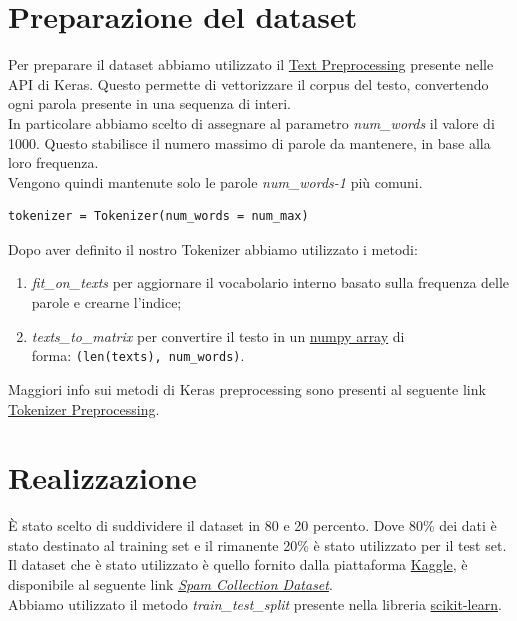 \section{Preparazione del dataset}
Per preparare il dataset abbiamo utilizzato il \href{https://keras.io/preprocessing/text/#Tokenizer}{Text Preprocessing} presente nelle API di Keras. Questo permette di vettorizzare il corpus del testo, convertendo ogni parola presente in una sequenza di interi.\\
In particolare abbiamo scelto di assegnare al parametro \textit{num\_words} il valore di 1000. Questo stabilisce il numero massimo di parole da mantenere, in base alla loro frequenza.\\
Vengono quindi mantenute solo le parole \textit{num\_words-1} più comuni.
\begin{lstlisting}[backgroundcolor = \color{white}]
tokenizer = Tokenizer(num_words = num_max)
\end{lstlisting}
Dopo aver definito il nostro Tokenizer abbiamo utilizzato i metodi: 
\begin{enumerate}
	\item \textit{fit\_on\_texts} per aggiornare il vocabolario interno basato sulla frequenza delle parole e crearne l'indice;
	\item \textit{texts\_to\_matrix} per convertire il testo in un \href{https://docs.scipy.org/doc/numpy/reference/generated/numpy.array.html}{numpy array} di\\ 
	forma: \texttt{(len(texts), num\_words)}.
\end{enumerate}
Maggiori info sui metodi di Keras preprocessing sono presenti al seguente link \href{http://faroit.com/keras-docs/2.0.2/preprocessing/text/}{Tokenizer Preprocessing}.

\section{Realizzazione}
È stato scelto di suddividere il dataset in 80 e 20 percento. Dove 80\% dei dati è stato destinato al training set e il rimanente 20\% è stato utilizzato per il test set. \\
Il dataset che è stato utilizzato è quello fornito dalla piattaforma \href{https://www.kaggle.com/}{Kaggle}, è disponibile al seguente link \href{https://www.kaggle.com/uciml/sms-spam-collection-dataset}{\textit{Spam Collection Dataset}}.\\
Abbiamo utilizzato il metodo \textit{train\_test\_split} presente nella libreria \href{https://scikit-learn.org/stable/modules/generated/sklearn.model_selection.train_test_split.html#sklearn-model-selection-train-test-split}{scikit-learn}. 


